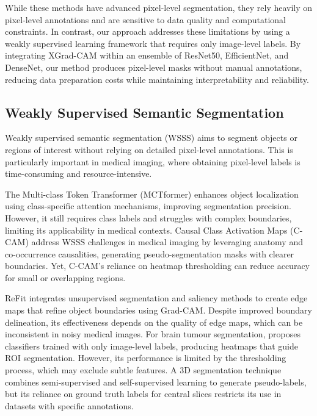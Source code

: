 While these methods have advanced pixel-level segmentation, they rely heavily on pixel-level annotations and are sensitive to data quality and computational constraints. In contrast, our approach addresses these limitations by using a weakly supervised learning framework that requires only image-level labels. By integrating XGrad-CAM within an ensemble of ResNet50, EfficientNet, and DenseNet, our method produces pixel-level masks without manual annotations, reducing data preparation costs while maintaining interpretability and reliability.

\subsection{Weakly Supervised Semantic Segmentation}

Weakly supervised semantic segmentation (WSSS) aims to segment objects or regions of interest without relying on detailed pixel-level annotations. This is particularly important in medical imaging, where obtaining pixel-level labels is time-consuming and resource-intensive.

The Multi-class Token Transformer (MCTformer) \cite{ref16} enhances object localization using class-specific attention mechanisms, improving segmentation precision. However, it still requires class labels and struggles with complex boundaries, limiting its applicability in medical contexts. Causal Class Activation Maps (C-CAM) \cite{ref17} address WSSS challenges in medical imaging by leveraging anatomy and co-occurrence causalities, generating pseudo-segmentation masks with clearer boundaries. Yet, C-CAM’s reliance on heatmap thresholding can reduce accuracy for small or overlapping regions.

ReFit \cite{ref18} integrates unsupervised segmentation and saliency methods to create edge maps that refine object boundaries using Grad-CAM. Despite improved boundary delineation, its effectiveness depends on the quality of edge maps, which can be inconsistent in noisy medical images. For brain tumour segmentation, \cite{ref19} proposes classifiers trained with only image-level labels, producing heatmaps that guide ROI segmentation. However, its performance is limited by the thresholding process, which may exclude subtle features. A 3D segmentation technique \cite{ref20} combines semi-supervised and self-supervised learning to generate pseudo-labels, but its reliance on ground truth labels for central slices restricts its use in datasets with specific annotations.

